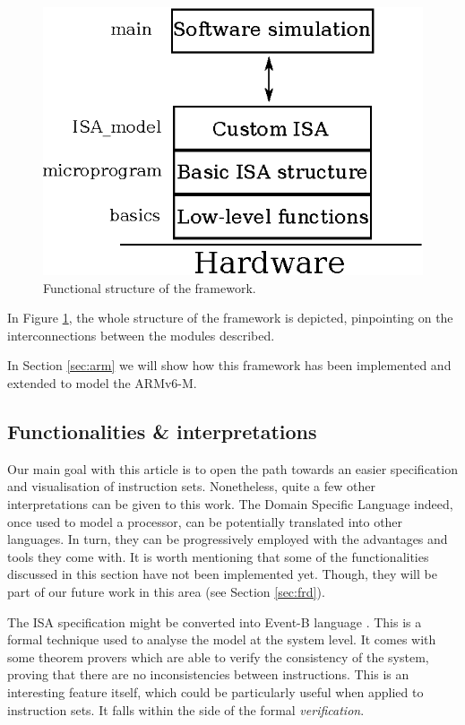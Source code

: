 \documentclass[conference]{IEEEtran}
\begin{document}
\begin{figure}[ht!]
\begin{center}
	\includegraphics[scale=1]{IMG/structure.eps}
	\caption{Functional structure of the framework.}
	\label{fig:structure}
\end{center}
\end{figure}

In Figure \ref{fig:structure}, the whole structure of the framework is depicted, pinpointing 
on the interconnections between the modules described. 

In Section \ref{sec:arm} we will show how this framework has been implemented and extended
to model the ARMv6-M.

\subsection{Functionalities \& interpretations}
\label{sec:func}
Our main goal with this article is to open the path towards an easier specification and
visualisation of instruction sets. Nonetheless, quite a few other interpretations can be
given to this work. The Domain Specific Language indeed, once used to model
a processor, can be potentially translated into other languages. In turn, they
can be progressively employed with the advantages and tools they come with. It is worth
mentioning that some of the functionalities discussed in this section have not been
implemented yet. Though, they will be part of our future work in this area (see Section
\ref{sec:frd}).

The ISA specification might be converted into Event-B language \cite{eventB}. This is a
formal technique used to analyse the model at the system level. It comes with some theorem
provers which are able to verify the consistency of the system, proving that there are 
no inconsistencies between instructions. This is an interesting feature itself, which could
be particularly useful when applied to instruction sets. It falls within the side of the
formal \textit{verification}.
\end{document}
